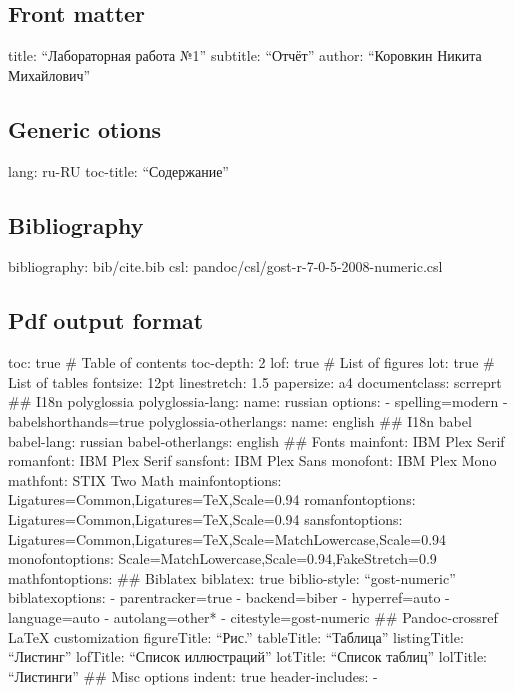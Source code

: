 \hypertarget{front-matter}{%
\subsection{Front matter}\label{front-matter}}

title: ``Лабораторная работа №1'' subtitle: ``Отчёт'' author: ``Коровкин
Никита Михайлович''

\hypertarget{generic-otions}{%
\subsection{Generic otions}\label{generic-otions}}

lang: ru-RU toc-title: ``Содержание''

\hypertarget{bibliography}{%
\subsection{Bibliography}\label{bibliography}}

bibliography: bib/cite.bib csl: pandoc/csl/gost-r-7-0-5-2008-numeric.csl

\hypertarget{pdf-output-format}{%
\subsection{Pdf output format}\label{pdf-output-format}}

toc: true \# Table of contents toc-depth: 2 lof: true \# List of figures
lot: true \# List of tables fontsize: 12pt linestretch: 1.5 papersize:
a4 documentclass: scrreprt \#\# I18n polyglossia polyglossia-lang: name:
russian options: - spelling=modern - babelshorthands=true
polyglossia-otherlangs: name: english \#\# I18n babel babel-lang:
russian babel-otherlangs: english \#\# Fonts mainfont: IBM Plex Serif
romanfont: IBM Plex Serif sansfont: IBM Plex Sans monofont: IBM Plex
Mono mathfont: STIX Two Math mainfontoptions:
Ligatures=Common,Ligatures=TeX,Scale=0.94 romanfontoptions:
Ligatures=Common,Ligatures=TeX,Scale=0.94 sansfontoptions:
Ligatures=Common,Ligatures=TeX,Scale=MatchLowercase,Scale=0.94
monofontoptions: Scale=MatchLowercase,Scale=0.94,FakeStretch=0.9
mathfontoptions: \#\# Biblatex biblatex: true biblio-style:
``gost-numeric'' biblatexoptions: - parentracker=true - backend=biber -
hyperref=auto - language=auto - autolang=other* - citestyle=gost-numeric
\#\# Pandoc-crossref LaTeX customization figureTitle: ``Рис.''
tableTitle: ``Таблица'' listingTitle: ``Листинг'' lofTitle: ``Список
иллюстраций'' lotTitle: ``Список таблиц'' lolTitle: ``Листинги'' \#\#
Misc options indent: true header-includes: -

